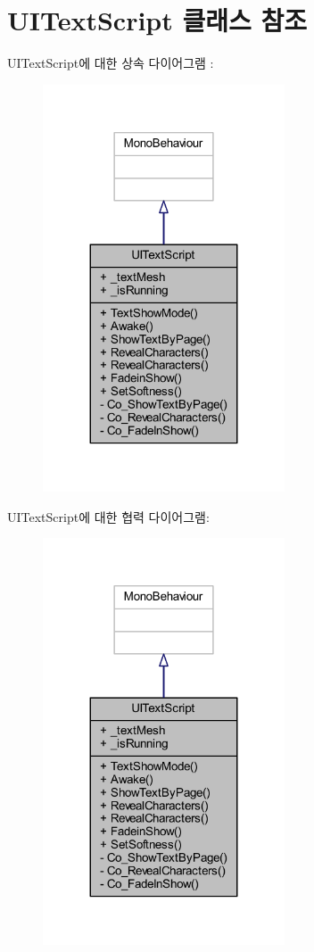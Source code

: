 \hypertarget{class_u_i_text_script}{}\section{U\+I\+Text\+Script 클래스 참조}
\label{class_u_i_text_script}


U\+I\+Text\+Script에 대한 상속 다이어그램 \+: \nopagebreak
\begin{figure}[H]
\begin{center}
\leavevmode
\includegraphics[width=203pt]{db/d20/class_u_i_text_script__inherit__graph}
\end{center}
\end{figure}


U\+I\+Text\+Script에 대한 협력 다이어그램\+:\nopagebreak
\begin{figure}[H]
\begin{center}
\leavevmode
\includegraphics[width=203pt]{d1/d6a/class_u_i_text_script__coll__graph}
\end{center}
\end{figure}
